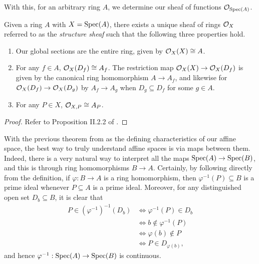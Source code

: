 With this, for an arbitrary ring $A$, we determine our sheaf of functions $\mathcal{O}_{{\rm Spec}(A)}$.

\begin{theorem}
    Given a ring $A$ with $X = {\rm Spec}(A)$,
    there exists a unique sheaf of rings $\mathcal{O}_X$ referred to as the \textit{structure sheaf} such that the following three properties hold.
    \begin{enumerate}
        \item Our global sections are the entire ring, given by $\mathcal{O}_X(X) \cong A$.
        \item For any $f \in A$, $\mathcal{O}_X(D_f) \cong A_f$. 
        The restriction map $\mathcal{O}_X(X) \to \mathcal{O}_X(D_f)$ is given by the canonical ring homomorphism $A \to A_f$,
        and likewise for $\mathcal{O}_X(D_f) \to \mathcal{O}_X(D_g)$ by $A_f \to A_g$ when $D_g \subseteq D_f$ for some $g \in A$.
        \item For any $P \in X$, $\mathcal{O}_{X, P} \cong A_P$.
    \end{enumerate}
\end{theorem}

\begin{proof}
    Refer to Proposition II.2.2 of \cite{Hartshorne_2013}.
\end{proof}

With the previous theorem from as the defining characteristics of our affine space,
the best way to truly understand affine spaces is via maps between them.
Indeed, there is a very natural way to interpret all the maps ${\rm Spec}(A) \to {\rm Spec}(B)$,
and this is through ring homomorphisms $B \to A$.
Certainly, by following directly from the definition,
if $\varphi : B \to A$ is a ring homomorphism,
then $\varphi^{-1}(P) \subseteq B$ is a prime ideal whenever $P \subseteq A$ is a prime ideal.
Moreover, for any distinguished open set $D_b \subseteq B$,
it is clear that
\begin{align*}
    P \in (\varphi^{-1})^{-1}(D_b)
    & \iff \varphi^{-1}(P) \in D_b \\
    & \iff b \notin \varphi^{-1}(P) \\
    & \iff \varphi(b) \notin P \\
    & \iff P \in D_{\varphi(b)},
\end{align*}
and hence $\varphi^{-1} : {\rm Spec}(A) \to {\rm Spec}(B)$ is continuous.

